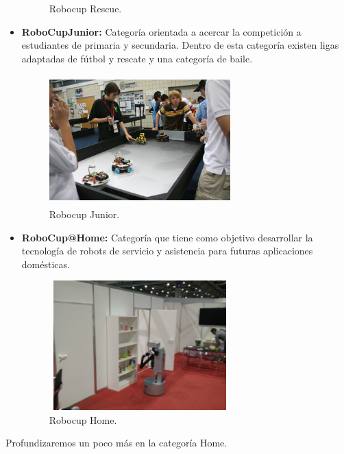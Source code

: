\begin{itemize}
\begin{figure}[H]
\begin{center}
  \end{center}
  \caption{Robocup Rescue.}
  \label{fig:robocup-rescue}
\end{figure}
  \item \textbf{RoboCupJunior:} Categoría orientada a acercar la competición a estudiantes de primaria y secundaria. Dentro de esta categoría existen ligas adaptadas de fútbol y rescate y una categoría de baile.
  \begin{figure}[H]  
  \begin{center}
    \includegraphics[width=7cm,height=5cm]{img/cap1/robocup-junior}
  \end{center}
  \caption{Robocup Junior.}
  \label{fig:robocup-junior}
\end{figure}
  \item \textbf{RoboCup@Home:} Categoría que tiene como objetivo desarrollar la tecnología de robots de servicio y asistencia para futuras aplicaciones domésticas.
  \begin{figure}[H]  
  \begin{center}
    \includegraphics[width=7cm,height=5cm]{img/cap1/robocup-home}
  \end{center}
  \caption{Robocup Home.}
  \label{fig:robocup-home}
\end{figure}
\end{itemize}

Profundizaremos un poco más en la categoría Home.

